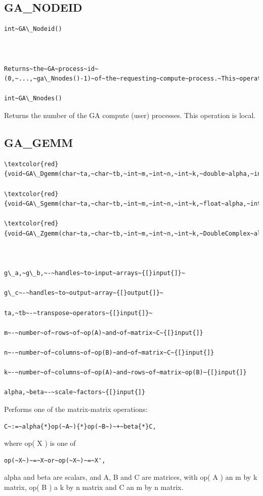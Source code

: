 \subsection*{GA\_NODEID}
\begin{verbatim}
int~GA\_Nodeid()



Returns~the~GA~process~id~(0,~...,~ga\_Nnodes()-1)~of~the~requesting~compute~process.~This~operation~is~local.~GA\_NNODES

int~GA\_Nnodes()
\end{verbatim}
Returns the number of the GA compute (user) processes. This operation
is local. 


\subsection*{GA\_GEMM}
\begin{verbatim}
\textcolor{red}{void~GA\_Dgemm(char~ta,~char~tb,~int~m,~int~n,~int~k,~double~alpha,~int~g\_a,~int~g\_b,~double~beta,~int~g\_c~)~}

\textcolor{red}{void~GA\_Sgemm(char~ta,~char~tb,~int~m,~int~n,~int~k,~float~alpha,~int~g\_a,~int~g\_b,~float~beta,~int~g\_c~)~}

\textcolor{red}{void~GA\_Zgemm(char~ta,~char~tb,~int~m,~int~n,~int~k,~DoubleComplex~alpha,~int~g\_a,~int~g\_b,~DoubleComplex~beta,~int~g\_c~)}



g\_a,~g\_b,~-~handles~to~input~arrays~{[}input{]}~

g\_c~-~handles~to~output~array~{[}output{]}~

ta,~tb~-~transpose~operators~{[}input{]}~

m~-~number~of~rows~of~op(A)~and~of~matrix~C~{[}input{]}

n~-~number~of~columns~of~op(B)~and~of~matrix~C~{[}input{]}

k~-~number~of~columns~of~op(A)~and~rows~of~matrix~op(B)~{[}input{]}

alpha,~beta~-~scale~factors~{[}input{]}
\end{verbatim}
Performs one of the matrix-matrix operations:
\begin{verbatim}
C~:=~alpha{*}op(~A~){*}op(~B~)~+~beta{*}C,
\end{verbatim}
where op( X ) is one of
\begin{verbatim}
op(~X~)~=~X~or~op(~X~)~=~X',
\end{verbatim}
alpha and beta are scalars, and A, B and C are matrices, with op(
A ) an m by k matrix, op( B ) a k by n matrix and C an m by n matrix.

